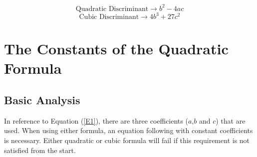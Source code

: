 \documentclass[14pt]{extarticle}
\begin{document}
\begin{equation}
	\text{Quadratic Discriminant} \to b^2-4ac
	\label{E3}
\end{equation}
\begin{equation}
	\text{Cubic Discriminant} \to 4b^3+27c^2
	\label{E4}
\end{equation}

\section{The Constants of the Quadratic Formula}
\subsection{Basic Analysis}
In reference to Equation (\ref{E1}), there are three coefficients ($a$,$b$ and $c$) that are used. When using either formula, an equation following with constant coefficients is necessary. Either quadratic or cubic formula will fail if this requirement is not satisfied from the start.
\end{document}
